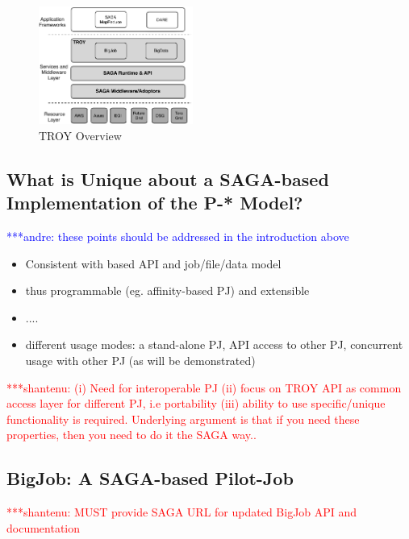 \documentclass[conference,final]{IEEEtran}
\newcommand{\jhanote}[1]{ {\textcolor{red} { ***shantenu: #1 }}}
\newcommand{\alnote}[1]{ {\textcolor{blue} { ***andre: #1 }}}
\newcommand{\alnote}[1]{}
\newcommand{\jhanote}[1]{}
\begin{document}
\begin{figure}[htbp]
	\centering
		\includegraphics[width=0.45\textwidth]{figures/troy.pdf}
	\caption{TROY Overview}
	\label{fig:figures_troy}
\end{figure}


\subsection{What is Unique about a SAGA-based Implementation of the
  P-* Model?}
\alnote{these points should be addressed in the introduction above}
\begin{itemize}
\item Consistent with based API and job/file/data model
\item thus programmable (eg. affinity-based PJ) and extensible 
\item ....
\item different usage modes: a stand-alone PJ, API access to other PJ,
  concurrent usage with other PJ (as will be demonstrated)
\end{itemize}


\jhanote{(i) Need for interoperable PJ (ii) focus on TROY API as
  common access layer for different PJ, i.e portability (iii) ability
  to use specific/unique functionality is required. Underlying
  argument is that if you need these properties, then you need to do
  it the SAGA way..}

\subsection{BigJob: A SAGA-based Pilot-Job}

\jhanote{MUST provide SAGA URL for updated BigJob API and
  documentation}


\end{document}
